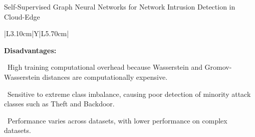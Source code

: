 \documentclass[aspectratio=169,10pt]{beamer}
\begin{document}
\begin{frame}[t]{Self-Supervised Graph Neural Networks for Network Intrusion Detection in Cloud-Edge}
{\begin{tabularx}{\textwidth}{|L{3.10cm}|Y|L{5.70cm}|}
\begin{minipage}[t]{\linewidth}
\textcolor{limitRed}{\textbf{Disadvantages:}}\par\vspace{1.3pt}
\textbullet~High training computational overhead because Wasserstein and Gromov-Wasserstein distances are computationally expensive.\par\vspace{1.8pt}\textbullet~Sensitive to extreme class imbalance, causing poor detection of minority attack classes such as Theft and Backdoor.\par\vspace{1.8pt}\textbullet~Performance varies across datasets, with lower performance on complex datasets.\par\vspace{3pt}
\end{minipage} \\\hline
\end{tabularx}}
\end{frame}
\end{document}

